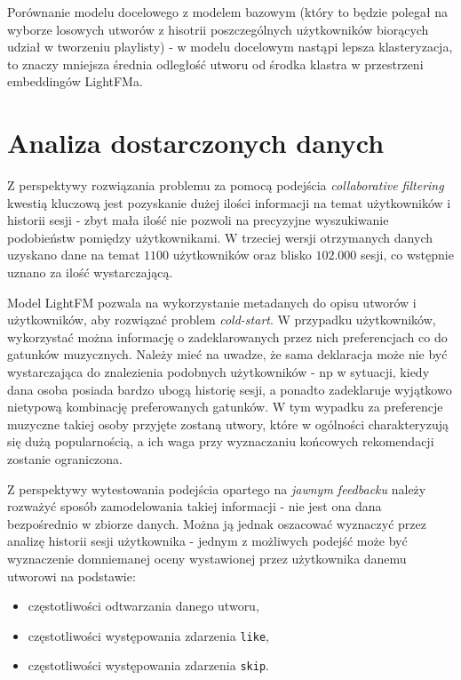 \documentclass[10pt,a4paper]{article}
\begin{document}
Porównanie modelu docelowego z modelem bazowym (który to będzie polegał na wyborze losowych utworów z hisotrii poszczególnych użytkowników biorących udział w tworzeniu playlisty) - w modelu docelowym nastąpi lepsza klasteryzacja, to znaczy mniejsza średnia odległość utworu od środka klastra w przestrzeni embeddingów LightFMa.

\section{Analiza dostarczonych danych}


Z perspektywy rozwiązania problemu za pomocą podejścia \textit{collaborative filtering} kwestią kluczową jest pozyskanie dużej ilości informacji na temat użytkowników i historii sesji - zbyt mała ilość nie pozwoli na precyzyjne wyszukiwanie podobieństw pomiędzy użytkownikami. W trzeciej wersji otrzymanych danych uzyskano dane na temat $1100$ użytkowników oraz blisko $102.000$ sesji, co wstępnie uznano za ilość wystarczającą.


Model LightFM pozwala na wykorzystanie metadanych do opisu utworów i użytkowników, aby rozwiązać problem \textit{cold-start}. W przypadku użytkowników, wykorzystać można informację o zadeklarowanych przez nich preferencjach co do gatunków muzycznych. Należy mieć na uwadze, że sama deklaracja może nie być wystarczająca do znalezienia podobnych użytkowników - np w sytuacji, kiedy dana osoba posiada bardzo ubogą historię sesji, a ponadto zadeklaruje wyjątkowo nietypową kombinację preferowanych gatunków. W tym wypadku za preferencje muzyczne takiej osoby przyjęte zostaną utwory, które w ogólności charakteryzują się dużą popularnością, a ich waga przy wyznaczaniu końcowych rekomendacji zostanie ograniczona. 

Z perspektywy wytestowania podejścia opartego na \textit{jawnym feedbacku} należy rozważyć sposób zamodelowania takiej informacji - nie jest ona dana bezpośrednio w zbiorze danych. Można ją jednak oszacować wyznaczyć przez analizę historii sesji użytkownika - jednym z możliwych podejść może być wyznaczenie domniemanej oceny wystawionej przez użytkownika danemu utworowi na podstawie:

\begin{itemize}

\item częstotliwości odtwarzania danego utworu,
\item częstotliwości występowania zdarzenia \texttt{like},
\item częstotliwości występowania zdarzenia \texttt{skip}.

\end{itemize}
\end{document}
